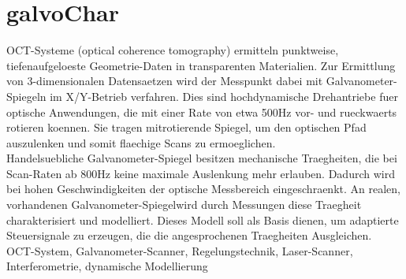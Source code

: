 \chapter{galvoChar}
\newcommand \galvo {Galvanometer-Spiegel}
\newcommand \bildwidth {0.95\textwidth}

\newcommand \bild[4]{\begin{figure}[#1]	\centering	\texttt{[image: pics/\#2]}	\caption{#3}	\label{#4}	\end{figure}}


OCT-Systeme (optical coherence tomography) ermitteln punktweise, tiefenaufgeloeste Geometrie-Daten in transparenten Materialien. Zur Ermittlung von 3-dimensionalen Datensaetzen wird der Messpunkt dabei mit \galvo n im X/Y-Betrieb verfahren. Dies sind hochdynamische Drehantriebe fuer optische Anwendungen, die mit einer Rate von etwa 500Hz vor- und rueckwaerts rotieren koennen. Sie tragen mitrotierende Spiegel, um den optischen Pfad auszulenken und somit flaechige Scans zu ermoeglichen. \\ 
Handelsuebliche Galvanometer-Spiegel besitzen mechanische Traegheiten, die bei Scan-Raten ab 800Hz keine maximale Auslenkung mehr erlauben. Dadurch wird bei hohen Geschwindigkeiten der optische Messbereich eingeschraenkt. An realen, vorhandenen \galvo wird durch Messungen diese Traegheit charakterisiert und modelliert. Dieses Modell soll als Basis dienen, um adaptierte Steuersignale zu erzeugen, die die angesprochenen Traegheiten Ausgleichen.\\

OCT-System, Galvanometer-Scanner, Regelungstechnik, Laser-Scanner, Interferometrie, dynamische Modellierung

